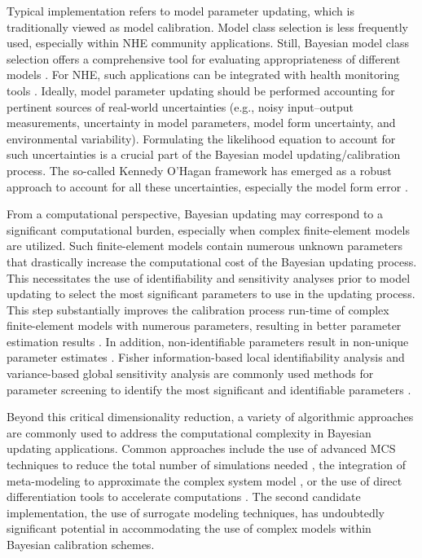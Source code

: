 Typical implementation refers to model parameter updating, which is traditionally viewed as model calibration. Model class selection is less frequently used, especially within NHE community applications. Still, Bayesian model class selection offers a comprehensive tool for evaluating appropriateness of different models \citep{muto2008bayesian}. For NHE, such applications can be integrated with health monitoring tools \citep{oh2018bayesian}. Ideally, model parameter updating should be performed accounting for pertinent sources of real-world uncertainties (e.g., noisy input--output measurements, uncertainty in model parameters, model form uncertainty, and environmental variability). Formulating the likelihood equation to account for such uncertainties is a crucial part of the Bayesian model updating/calibration process. The so-called Kennedy O'Hagan framework has emerged as a robust approach to account for all these uncertainties, especially the model form error \citep{kennedy2001bayesian}. 

From a computational perspective, Bayesian updating may correspond to a significant computational burden, especially when complex finite-element models are utilized. Such finite-element models contain numerous unknown parameters that drastically increase the computational cost of the Bayesian updating process. This necessitates the use of identifiability and sensitivity analyses prior to model updating to select the most significant parameters to use in the updating process. This step substantially improves the calibration process run-time of complex finite-element models with numerous parameters, resulting in better parameter estimation results \citep{ramancha2021bayesianupdating}. In addition, non-identifiable parameters result in non-unique parameter estimates \citep{ramancha2020nonunique}. Fisher information-based local identifiability analysis and variance-based global sensitivity analysis are commonly used methods for parameter screening to identify the most significant and identifiable parameters \citep{ramancha2021bayesianupdating}.

Beyond this critical dimensionality reduction, a variety of algorithmic approaches are commonly used to address the computational complexity in Bayesian updating applications. Common approaches include the use of advanced MCS techniques to reduce the total number of simulations needed \citep{quiroz2018speeding}, the integration of meta-modeling to approximate the complex system model \citep{angelikopoulos2015xtmcmc, giovanis2017bayesian, wang2019reliabilitybased, zhang2019accelerating}, or the use of direct differentiation tools to accelerate computations \citep{astroza2017batch}. The second candidate implementation, the use of surrogate modeling techniques, has undoubtedly significant potential in accommodating the use of complex models within Bayesian calibration schemes.     

